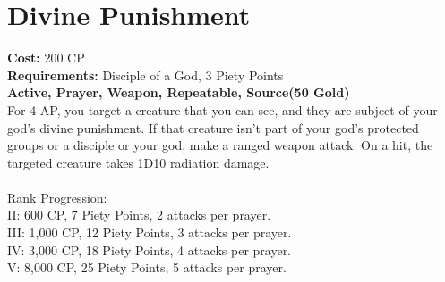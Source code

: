 \section{Divine Punishment}\label{prayer:divinePunishment}
\textbf{Cost:} 200 CP\\
\textbf{Requirements:} Disciple of a God, 3 Piety Points \\
\textbf{Active, Prayer, Weapon, Repeatable, Source(50 Gold)}\\
For 4 AP, you target a creature that you can see, and they are subject of your god's divine punishment.
If that creature isn't part of your god's protected groups or a disciple or your god, make a ranged weapon attack.
On a hit, the targeted creature takes 1D10 radiation damage.\\
\\
Rank Progression:\\
II: 600 CP, 7 Piety Points, 2 attacks per prayer.\\
III: 1,000 CP, 12 Piety Points, 3 attacks per prayer.\\
IV: 3,000 CP, 18 Piety Points, 4 attacks per prayer.\\
V: 8,000 CP, 25 Piety Points, 5 attacks per prayer.\\